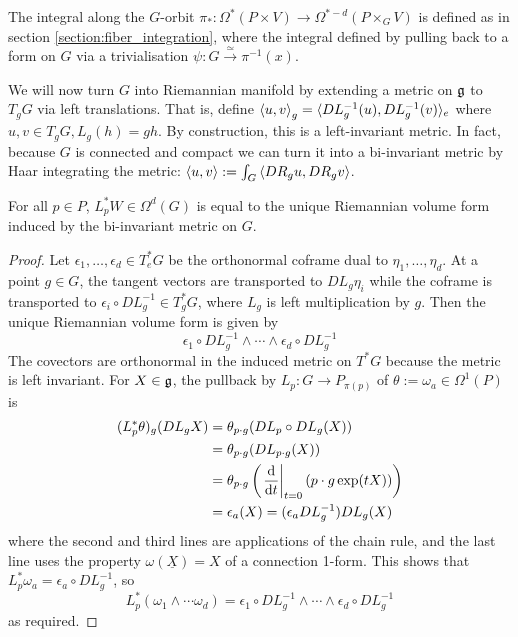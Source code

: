The integral along the $G$-orbit 
$\pi_*:\Omega^{*}(P\times V) \to \Omega^{*-d}(P\times_G V)$ is defined as in 
section \ref{section:fiber_integration}, where the integral defined by 
pulling back to a form on $G$ via a trivialisation
$\psi:G\xrightarrow{\simeq} \pi^{-1}(x)$.   

We will now turn $G$ into Riemannian manifold by 
extending a metric on $\operatorname{\mathfrak{g}}$ to $T_gG$ via left translations. That is, define
$\gen{u,v}_g = \gen[*]{DL_g^{-1}(u),DL_g^{-1}(v)}_e$ where $u,v\in T_gG,L_g(h) = gh$.
By construction, this is a left-invariant metric. In fact, because $G$ is
connected and compact we can turn it into a
bi-invariant metric by Haar integrating the metric: $\gen{u,v}:=\int_G
\gen{DR_gu,DR_g v}$.

\begin{prop}
	For all $p\in P$,  $L_p^* W \in \Omega^d(G)$ is equal to the unique
	Riemannian volume form induced by the bi-invariant metric on $G$. 
\end{prop}
\begin{proof}
	Let $\epsilon_1,\ldots,\epsilon_d\in T^*_eG$ be the orthonormal coframe dual
	to $\eta_1,\ldots,\eta_d$. At a point $g\in G$, the tangent vectors are
	transported to  $DL_g \eta_i$ while the coframe is transported to 
	$\epsilon_i\circ DL_{g}^{-1} \in T^*_gG$, where $L_g$ is left multiplication
	by  $g$. Then the unique Riemannian volume form is given by
	\[
	    \epsilon_1\circ DL_{g}^{-1} \wedge \cdots\wedge \epsilon_d\circ DL_{g}^{-1}
	\] 
	The covectors are orthonormal in the induced metric on $T^*G$ because the 
	metric is left invariant. For $X\in \operatorname{\mathfrak{g}}$, the pullback
	by $L_p : G \to P_{\pi(p)}$ of $\theta := \omega_a \in \Omega^1(P)$ is
	\begin{align*}
		(L_p^*\theta)_g(DL_g X) 
		&= \theta_{p\cdot g}(DL_p \circ DL_g(X)) \\
		&= \theta_{p\cdot g}(DL_{p\cdot g} (X)) \\
		&= \theta_{p\cdot g}\paren{\odv{}{t}_{t=0} (p\cdot g \exp(tX))} \\
		&= \epsilon_a(X)
		= (\epsilon_a DL_g^{-1})DL_g(X)
	\end{align*}
	where the second and third lines are applications of the chain rule, and the
	last line uses the property $\omega(\underline{X}) = X$ of a
	connection 1-form.
	This shows that $L_p^*\omega_a = \epsilon_a\circ DL_g^{-1}$, so 
	\[
	L_p^* (\omega_1\wedge \cdots\omega_d)
	= \epsilon_1\circ DL_{g}^{-1} \wedge \cdots\wedge \epsilon_d\circ DL_{g}^{-1}
	\] 
	as required.
\end{proof}
